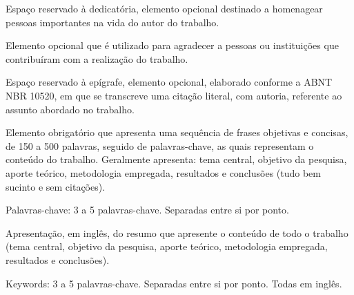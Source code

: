 
\OnehalfSpacing

\imprimircapa

\imprimirfolhaderosto



\begin{dedicatoria}
\null
\vfill
Espaço reservado à dedicatória, elemento opcional destinado a homenagear pessoas importantes na vida do autor do trabalho.
\end{dedicatoria}


\begin{agradecimentos}[Agradecimentos]
Elemento opcional que é utilizado para agradecer a pessoas ou instituições que contribuíram com a realização do trabalho.
\end{agradecimentos}

\begin{epigrafe}
\null
\vfill
Espaço reservado à epígrafe, elemento opcional, elaborado conforme a ABNT NBR 10520, em que se transcreve uma citação literal, com autoria, referente ao assunto abordado no trabalho.
\end{epigrafe}


\begin{resumo}
Elemento obrigatório que apresenta uma sequência de frases objetivas e concisas, de 150 a 500 palavras, seguido de palavras-chave, as quais representam o conteúdo do trabalho. Geralmente apresenta: tema central, objetivo da pesquisa, aporte teórico, metodologia empregada, resultados e conclusões (tudo bem sucinto e sem citações).


Palavras-chave: 3 a 5 palavras-chave. Separadas entre si por ponto.
\end{resumo}

\begin{resumo}[Abstract]
Apresentação, em inglês, do resumo que apresente o conteúdo de todo o trabalho (tema central, objetivo da pesquisa, aporte teórico, metodologia empregada, resultados e conclusões).


Keywords: 3 a 5 palavras-chave. Separadas entre si por ponto. Todas em inglês.
\end{resumo}



